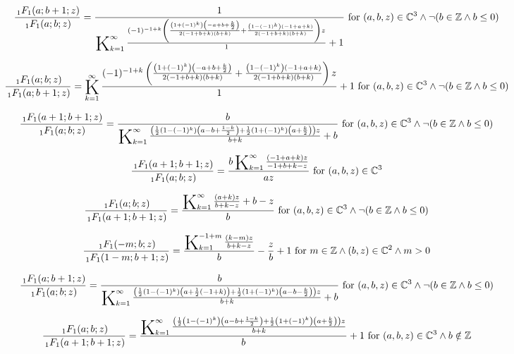 \documentclass{article}
\newcommand{\bigK}{\mathop{\raisebox{-5pt}{\huge K}}}
\begin{document}
\[\frac{\, _1F_1(a;b+1;z)}{\, _1F_1(a;b;z)}=\frac{1}{\bigK_{k=1}^{\infty}\frac{(-1)^{-1+k} \left(\frac{\left(1+(-1)^k\right) \left(-a+b+\frac{k}{2}\right)}{2 (-1+b+k) (b+k)}+\frac{\left(1-(-1)^k\right) (-1+a+k)}{2 (-1+b+k) (b+k)}\right) z}{1}+1}\text{ for }(a,b,z)\in \mathbb{C}^3\land \neg (b\in \mathbb{Z}\land b\leq 0)\] 

\[\frac{\, _1F_1(a;b;z)}{\, _1F_1(a;b+1;z)}=\bigK_{k=1}^{\infty}\frac{(-1)^{-1+k} \left(\frac{\left(1+(-1)^k\right) \left(-a+b+\frac{k}{2}\right)}{2 (-1+b+k) (b+k)}+\frac{\left(1-(-1)^k\right) (-1+a+k)}{2 (-1+b+k) (b+k)}\right) z}{1}+1\text{ for }(a,b,z)\in \mathbb{C}^3\land \neg (b\in \mathbb{Z}\land b\leq 0)\] 

\[\frac{\, _1F_1(a+1;b+1;z)}{\, _1F_1(a;b;z)}=\frac{b}{\bigK_{k=1}^{\infty}\frac{\left(\frac{1}{2} \left(1-(-1)^k\right) \left(a-b+\frac{1-k}{2}\right)+\frac{1}{2} \left(1+(-1)^k\right) \left(a+\frac{k}{2}\right)\right) z}{b+k}+b}\text{ for }(a,b,z)\in \mathbb{C}^3\land \neg (b\in \mathbb{Z}\land b\leq 0)\] 

\[\frac{\, _1F_1(a+1;b+1;z)}{\, _1F_1(a;b;z)}=\frac{b \bigK_{k=1}^{\infty}\frac{(-1+a+k) z}{-1+b+k-z}}{a z}\text{ for }(a,b,z)\in \mathbb{C}^3\] 

\[\frac{\, _1F_1(a;b;z)}{\, _1F_1(a+1;b+1;z)}=\frac{\bigK_{k=1}^{\infty}\frac{(a+k) z}{b+k-z}+b-z}{b}\text{ for }(a,b,z)\in \mathbb{C}^3\land \neg (b\in \mathbb{Z}\land b\leq 0)\] 

\[\frac{\, _1F_1(-m;b;z)}{\, _1F_1(1-m;b+1;z)}=\frac{\bigK_{k=1}^{-1+m}\frac{(k-m) z}{b+k-z}}{b}-\frac{z}{b}+1\text{ for }m\in \mathbb{Z}\land (b,z)\in \mathbb{C}^2\land m>0\] 

\[\frac{\, _1F_1(a;b+1;z)}{\, _1F_1(a;b;z)}=\frac{b}{\bigK_{k=1}^{\infty}\frac{\left(\frac{1}{2} \left(1-(-1)^k\right) \left(a+\frac{1}{2} (-1+k)\right)+\frac{1}{2} \left(1+(-1)^k\right) \left(a-b-\frac{k}{2}\right)\right) z}{b+k}+b}\text{ for }(a,b,z)\in \mathbb{C}^3\land \neg (b\in \mathbb{Z}\land b\leq 0)\] 

\[\frac{\, _1F_1(a;b;z)}{\, _1F_1(a+1;b+1;z)}=\frac{\bigK_{k=1}^{\infty}\frac{\left(\frac{1}{2} \left(1-(-1)^k\right) \left(a-b+\frac{1-k}{2}\right)+\frac{1}{2} \left(1+(-1)^k\right) \left(a+\frac{k}{2}\right)\right) z}{b+k}}{b}+1\text{ for }(a,b,z)\in \mathbb{C}^3\land b\notin \mathbb{Z}\] 
\end{document}
